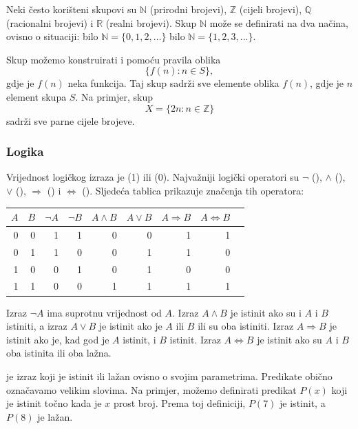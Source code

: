 Neki često korišteni skupovi su
$\mathbb{N}$ (prirodni brojevi),
$\mathbb{Z}$ (cijeli brojevi),
$\mathbb{Q}$ (racionalni brojevi) i
$\mathbb{R}$ (realni brojevi).
Skup $\mathbb{N}$
može se definirati na dva načina, ovisno
o situaciji:
bilo $\mathbb{N}=\{0,1,2,\ldots\}$
bilo $\mathbb{N}=\{1,2,3,...\}$.

Skup možemo konstruirati i pomoću pravila oblika
\[\{f(n) : n \in S\},\]
gdje je $f(n)$ neka funkcija.
Taj skup sadrži sve elemente oblika $f(n)$,
gdje je $n$ element skupa $S$.
Na primjer, skup
\[X=\{2n : n \in \mathbb{Z}\}\]
sadrži sve parne cijele brojeve.

\subsubsection{Logika}


Vrijednost logičkog izraza je
 (1) ili  (0).
Najvažniji logički operatori su
$\lnot$ (),
$\land$ (),
$\lor$ (),
$\Rightarrow$ () i
$\Leftrightarrow$ ().
Sljedeća tablica prikazuje značenja tih operatora:

\begin{center}
\begin{tabular}{rr|rrrrrrr}
$A$ & $B$ & $\lnot A$ & $\lnot B$ & $A \land B$ & $A \lor B$ & $A \Rightarrow B$ & $A \Leftrightarrow B$ \\
\hline
0 & 0 & 1 & 1 & 0 & 0 & 1 & 1 \\
0 & 1 & 1 & 0 & 0 & 1 & 1 & 0 \\
1 & 0 & 0 & 1 & 0 & 1 & 0 & 0 \\
1 & 1 & 0 & 0 & 1 & 1 & 1 & 1 \\
\end{tabular}
\end{center}

Izraz $\lnot A$ ima suprotnu vrijednost od $A$.
Izraz $A \land B$ je istinit ako su i $A$ i $B$
istiniti,
a izraz $A \lor B$ je istinit ako je $A$ ili $B$ ili su oba
istiniti.
Izraz $A \Rightarrow B$ je istinit
ako je, kad god je $A$ istinit, i $B$ istinit.
Izraz $A \Leftrightarrow B$ je istinit
ako su $A$ i $B$ oba istinita ili oba lažna.


 je izraz koji je istinit ili lažan
ovisno o svojim parametrima.
Predikate obično označavamo velikim slovima.
Na primjer, možemo definirati predikat $P(x)$
koji je istinit točno kada je $x$ prost broj.
Prema toj definiciji, $P(7)$ je istinit, a $P(8)$ je lažan.

